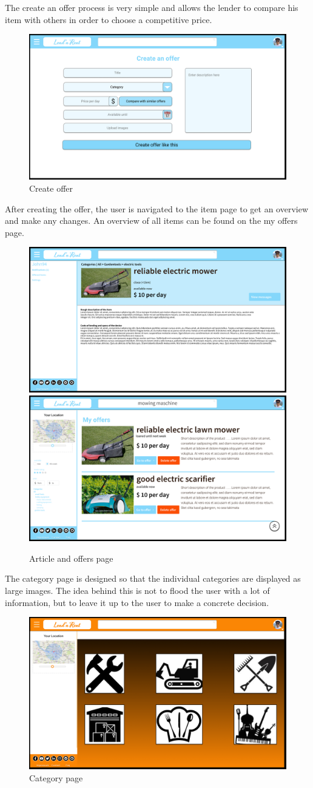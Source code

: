 \noindent
The create an offer process is very simple and allows the lender to compare his item with others in order to choose a competitive price.

\begin{figure}[H]
	\centering
	\includegraphics[width=0.5\linewidth]{abb/2offer}
	\caption{Create offer}
	\label{fig:2offer}
\end{figure} 

\noindent
After creating the offer, the user is navigated to the item page to get an overview and make any changes. An overview of all items can be found on the my offers page.

\begin{figure}[H]
	\centering
	\includegraphics[width=0.49\linewidth]{abb/4item}
	\includegraphics[width=0.49\linewidth]{abb/3offers}
	\caption{Article and offers page}
	\label{fig:article}
	\centering
\end{figure}

\noindent
The category page is designed so that the individual categories are displayed as large images. The idea behind this is not to flood the user with a lot of information, but to leave it up to the user to make a concrete decision.

\begin{figure}[H]
	\centering
	\includegraphics[width=0.5\linewidth]{abb/8start}
	\caption{Category page}
	\label{fig:8start}
\end{figure} 

